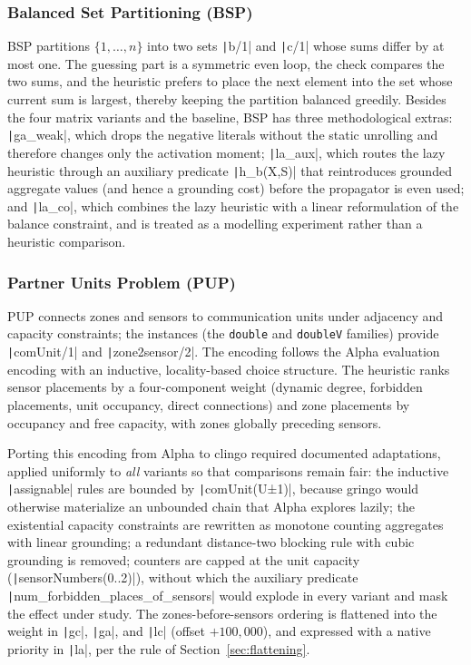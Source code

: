 \subsubsection{Balanced Set Partitioning (BSP)}

BSP partitions $\{1,\ldots,n\}$ into two sets \texttt|b/1| and \texttt|c/1| whose sums differ by at most one. The guessing part is a symmetric even loop, the check compares the two sums, and the heuristic prefers to place the next element into the set whose current sum is largest, thereby keeping the partition balanced greedily. Besides the four matrix variants and the baseline, BSP has three methodological extras: \texttt|ga_weak|, which drops the negative literals without the static unrolling and therefore changes only the activation moment; \texttt|la_aux|, which routes the lazy heuristic through an auxiliary predicate \texttt|h_b(X,S)| that reintroduces grounded aggregate values (and hence a grounding cost) before the propagator is even used; and \texttt|la_co|, which combines the lazy heuristic with a linear reformulation of the balance constraint, and is treated as a modelling experiment rather than a heuristic comparison.

\subsubsection{Partner Units Problem (PUP)}

PUP connects zones and sensors to communication units under adjacency and capacity constraints; the instances (the \texttt{double} and \texttt{doubleV} families) provide \texttt|comUnit/1| and \texttt|zone2sensor/2|. The encoding follows the Alpha evaluation encoding with an inductive, locality-based choice structure. The heuristic ranks sensor placements by a four-component weight (dynamic degree, forbidden placements, unit occupancy, direct connections) and zone placements by occupancy and free capacity, with zones globally preceding sensors.

Porting this encoding from Alpha to clingo required documented adaptations, applied uniformly to \emph{all} variants so that comparisons remain fair: the inductive \texttt|assignable| rules are bounded by \texttt|comUnit(U±1)|, because gringo would otherwise materialize an unbounded chain that Alpha explores lazily; the existential capacity constraints are rewritten as monotone counting aggregates with linear grounding; a redundant distance-two blocking rule with cubic grounding is removed; counters are capped at the unit capacity (\texttt|sensorNumbers(0..2)|), without which the auxiliary predicate \texttt|num_forbidden_places_of_sensors| would explode in every variant and mask the effect under study. The zones-before-sensors ordering is flattened into the weight in \texttt|gc|, \texttt|ga|, and \texttt|lc| (offset $+100{,}000$), and expressed with a native priority in \texttt|la|, per the rule of Section~\ref{sec:flattening}.

